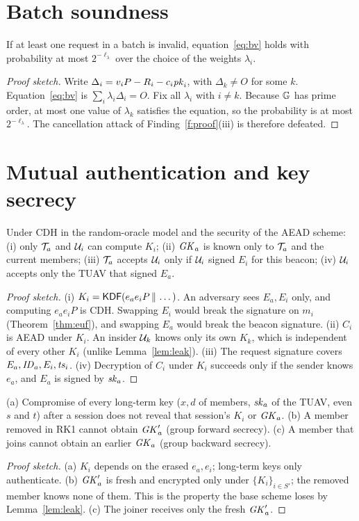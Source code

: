 \section{Batch soundness}
\begin{theorem}\label{thm:batch}
If at least one request in a batch is invalid, equation~\eqref{eq:bv} holds with probability at most $2^{-\ell_\lambda}$ over the choice of the weights $\lambda_i$.
\end{theorem}
\begin{proof}[Proof sketch]
Write $\Delta_i=v_iP-R_i-c_i\mathit{pk}_i$, with $\Delta_k\ne O$ for some $k$. Equation~\eqref{eq:bv} is $\sum_i\lambda_i\Delta_i=O$. Fix all $\lambda_i$ with $i\ne k$. Because $\mathbb{G}$
has prime order, at most one value of $\lambda_k$ satisfies the equation, so the probability is at most $2^{-\ell_\lambda}$. The cancellation attack of
Finding~\ref{f:proof}(iii) is therefore defeated.
\end{proof}

\section{Mutual authentication and key secrecy}
\begin{theorem}\label{thm:key}
Under CDH in the random-oracle model and the security of the AEAD scheme: (i) only $\mathcal{T}_a$ and $\mathcal{U}_i$ can compute $K_i$; (ii) $\mathit{GK}_a$ is known only to $\mathcal{T}_a$ and the
current members; (iii) $\mathcal{T}_a$ accepts $\mathcal{U}_i$ only if $\mathcal{U}_i$ signed $E_i$ for this beacon; (iv) $\mathcal{U}_i$ accepts only the TUAV that signed $E_a$.
\end{theorem}
\begin{proof}[Proof sketch]
(i) $K_i=\mathsf{KDF}(e_ae_iP\,\|\,\dots)$. An adversary sees $E_a,E_i$ only, and computing $e_ae_iP$ is CDH. Swapping $E_i$ would break the signature on $m_i$
(Theorem~\ref{thm:euf}), and swapping $E_a$ would break the beacon signature.
(ii) $C_i$ is AEAD under $K_i$. An insider $\mathcal{U}_k$ knows only its own $K_k$, which is independent of every other $K_i$ (unlike Lemma~\ref{lem:leak}).
(iii) The request signature covers $E_a,\mathit{ID}_a,E_i,\mathit{ts}_i$.
(iv) Decryption of $C_i$ under $K_i$ succeeds only if the sender knows $e_a$, and $E_a$ is signed by $\mathit{sk}_a$.
\end{proof}

\begin{theorem}\label{thm:fs}
(a) Compromise of every long-term key ($x,d$ of members, $\mathit{sk}_a$ of the TUAV, even $s$ and $t$) after a session does not reveal that session's $K_i$ or $\mathit{GK}_a$.
(b) A member removed in RK1 cannot obtain $\mathit{GK}'_a$ (group forward secrecy). (c) A member that joins cannot obtain an earlier $\mathit{GK}_a$ (group backward secrecy).
\end{theorem}
\begin{proof}[Proof sketch]
(a) $K_i$ depends on the erased $e_a,e_i$; long-term keys only authenticate. (b) $\mathit{GK}'_a$ is fresh and encrypted only under $\{K_i\}_{i\in S'}$; the removed
member knows none of them. This is the property the base scheme loses by Lemma~\ref{lem:leak}. (c) The joiner receives only the fresh $\mathit{GK}'_a$.
\end{proof}

